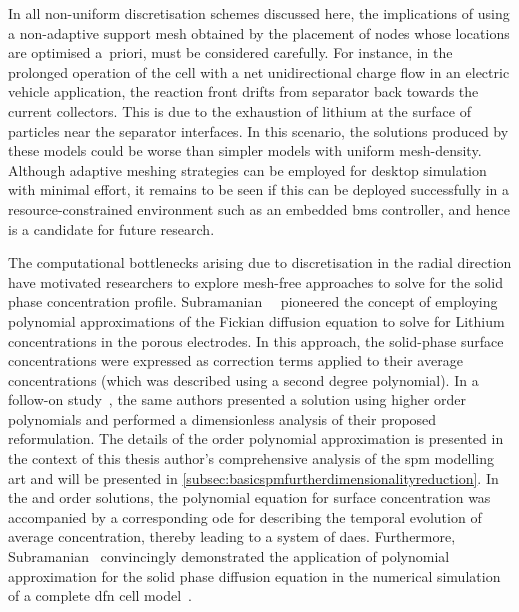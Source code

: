 In all  non-uniform discretisation schemes  discussed here, the  implications of
using  a non-adaptive  support mesh  obtained by  the placement  of nodes  whose
locations are optimised a~priori, must be considered carefully. For instance, in
the prolonged operation of the cell  with a net unidirectional charge flow \eg{}
in an  electric vehicle  application, the reaction  front drifts  from separator
back towards the current collectors. This is due to the exhaustion of lithium at
the surface  of particles near the  separator interfaces. In this  scenario, the
solutions  produced by  these models  could be  worse than  simpler models  with
uniform mesh-density. Although  adaptive meshing strategies can  be employed for
desktop simulation  with minimal effort,  it remains to be  seen if this  can be
deployed successfully in a resource-constrained  environment such as an embedded
\gls{bms} controller, and hence is  a candidate for future research.


The   computational   bottlenecks  arising   due   to   discretisation  in   the
radial   direction    have   motivated   researchers   to    explore   mesh-free
approaches   to    solve   for   the   solid    phase   concentration   profile.
Subramanian~\etal~\cite{Subramanian2004}  pioneered  the  concept  of  employing
polynomial approximations of the Fickian diffusion equation to solve for Lithium
concentrations  in the  porous  electrodes. In  this  approach, the  solid-phase
surface  concentrations were  expressed  as correction  terms  applied to  their
average concentrations (which  was described using a  second degree polynomial).
In  a   follow-on  study~\cite{Subramanian2005},  the  same   authors  presented
a  solution  using  higher  order  polynomials  and  performed  a  dimensionless
analysis of  their proposed reformulation.  The details of  the 
order  polynomial approximation  is  presented  in the  context  of this  thesis
author's  comprehensive  analysis  of  the  \gls{spm}  modelling  art  and  will
be  presented  in \cref{subsec:basicspmfurtherdimensionalityreduction}.  In  the
 and   order solutions, the  polynomial equation
for  surface concentration  was  accompanied by  a  corresponding \gls{ode}  for
describing  the temporal  evolution  of average  concentration, thereby  leading
to  a  system  of  \glspl{dae}.  Furthermore,  Subramanian~\etal{}  convincingly
demonstrated the  application of  polynomial approximation  for the  solid phase
diffusion  equation in  the numerical  simulation of  a complete  \gls{dfn} cell
model~\cite{Subramanian2007}.


